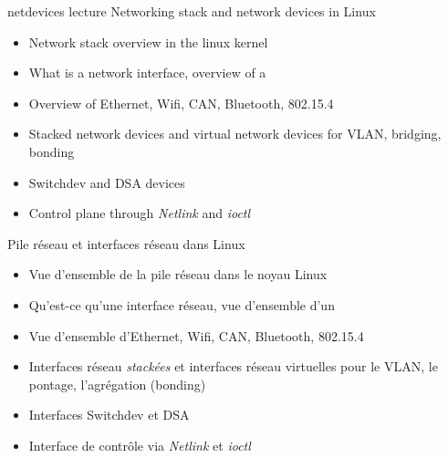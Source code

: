 \def \trainingprerequisites{
  \begin{itemize}
    \prerequisiteembeddedlinux
    \prerequisitekernel
    \prerequisiteenglish
  \end{itemize}
}


\def \trainers {
  \ifthenelse{\equal{\agendalanguage}{french}}{
    Un des ingénieurs suivants
  }{
    One of the following engineers
  }\\
  \vspace{-12pt}
  \begin{itemize}
  \item \href{https://bootlin.com/company/staff/maxime-chevallier/}{Maxime Chevallier}
  \end{itemize}
}

\def \onsitelecturetimeratio{50}
\def \onsitelabtimeratio{50}

{netdevices}
{lecture}
{Networking stack and network devices in Linux}
{
  \begin{itemize}
  \item Network stack overview in the linux kernel
  \item What is a network interface, overview of a 
  \item Overview of Ethernet, Wifi, CAN, Bluetooth, 802.15.4
  \item Stacked network devices and virtual network devices for VLAN,
    bridging, bonding
  \item Switchdev and DSA devices
  \item Control plane through {\em Netlink} and {\em ioctl}
  \end{itemize}
}
{Pile réseau et interfaces réseau dans Linux}
{
  \begin{itemize}
  \item Vue d'ensemble de la pile réseau dans le noyau Linux
  \item Qu'est-ce qu'une interface réseau, vue d'ensemble d'un 
  \item Vue d'ensemble d'Ethernet, Wifi, CAN, Bluetooth, 802.15.4
  \item Interfaces réseau {\em stackées} et interfaces réseau
    virtuelles pour le VLAN, le pontage, l'agrégation (bonding)
  \item Interfaces Switchdev et DSA
  \item Interface de contrôle via {\em Netlink} et {\em ioctl}
  \end{itemize}
}

